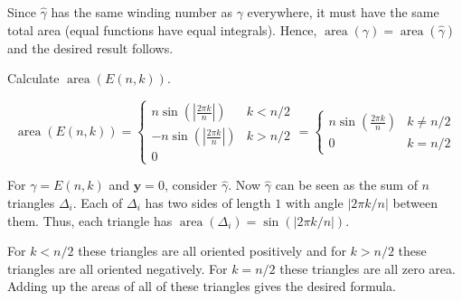 \documentclass[12 pt, letterpaper]{hmcpset}
\begin{document}
\begin{solution}
\begin{enumerate}
			Since $\hat{\gamma}$ has the same winding number as $\gamma$ everywhere, it must have the same total area (equal functions have equal integrals). Hence, $\operatorname{area}(\gamma) = \operatorname{area}(\hat{\gamma})$ and the desired result follows.
	\end{enumerate}
\end{solution}

\pagebreak

\begin{problem}[9.]
	Calculate $\operatorname{area}(E(n, k))$.
\end{problem}

\begin{solution}
	\[
		\boxed{
			\operatorname{area}(E(n, k)) = \begin{cases}
				n \sin{\left ( \left \lvert \frac{2 \pi k}{n} \right \rvert \right )} & k < n/2 \\
				- n \sin{\left ( \left \lvert \frac{2 \pi k}{n} \right \rvert \right )} & k > n/2 \\
				0
			\end{cases} = \begin{cases}
				n \sin{\left ( \frac{2 \pi k}{n} \right )} & k \neq n / 2 \\
				0 & k = n/2
			\end{cases}
		}
	\]

	For $\gamma = E(n, k)$ and $\mathbf{y} = 0$, consider $\hat{\gamma}$. Now $\hat{\gamma}$ can be seen as the sum of $n$ triangles $\Delta_{i}$. Each of $\Delta_{i}$ has two sides of length $1$ with angle $\lvert 2 \pi k / n \rvert$ between them. Thus, each triangle has $\operatorname{area}(\Delta_{i}) = \sin{(\lvert 2 \pi k / n \rvert)}$. 

	For $k < n / 2$ these triangles are all oriented positively and for $k > n / 2$ these triangles are all oriented negatively. For $k = n / 2$ these triangles are all zero area. Adding up the areas of all of these triangles gives the desired formula.
\end{solution}
\end{document}
